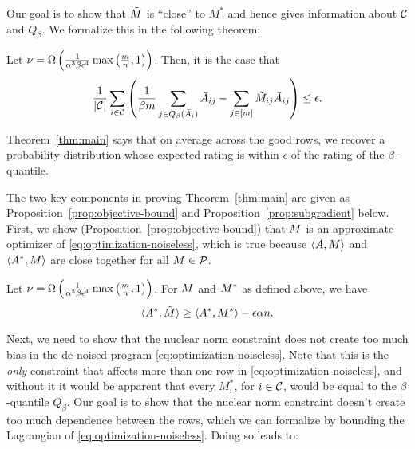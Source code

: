 Our goal is to show that $\tilde{M}$ is ``close'' to $M^*$ and hence gives information 
about $\mathcal{C}$ and $Q_{\beta}$. 
We formalize this in the following theorem:
\begin{theorem}
\label{thm:main}
Let $\nu = \Omega\left( \frac{1}{\alpha^3\beta\epsilon^4}\max\left( \frac{m}{n},1 \right) \right)$. Then, it is the case that 
\[ \frac{1}{|\mathcal{C}|} \sum_{i \in \mathcal{C}} \left( \frac{1}{\beta m} \sum_{j \in Q_{\beta}(\bar{A}_i)} \bar{A}_{ij} - \sum_{j \in [m]} \tilde{M}_{ij} \bar{A}_{ij} \right) \leq \epsilon. \]
\end{theorem}
Theorem~\ref{thm:main} says that on average across the good rows, we recover 
a probability distribution whose expected rating is within $\epsilon$ of 
the rating of the $\beta$-quantile. 

The two key components in proving Theorem~\ref{thm:main} are 
given as Proposition~\ref{prop:objective-bound} and 
Proposition~\ref{prop:subgradient} below. First, we show 
(Proposition~\ref{prop:objective-bound}) that $\tilde{M}$ is an approximate optimizer 
of \ref{eq:optimization-noiseless}, which is true because 
$\langle \tilde{A}, M \rangle$ and $\langle A^*, M \rangle$ are close together for 
all $M \in \mathcal{P}$.
\begin{proposition}
\label{prop:objective-bound}
Let $\nu = \Omega\left( \frac{1}{\alpha^3\beta\epsilon^4}\max\left( \frac{m}{n},1 \right) \right)$. For $\tilde{M}$ and $M^*$ as defined above, we have
\begin{equation}
\label{eq:objective-bound}
\langle A^*, \tilde{M} \rangle \geq \langle A^*, M^* \rangle - \epsilon \alpha n.
\end{equation}
\end{proposition}

Next, we need to show that the nuclear norm constraint does 
not create too much bias in the de-noised program 
\eqref{eq:optimization-noiseless}. Note that this is the \emph{only} constraint 
that affects more than one row in \eqref{eq:optimization-noiseless}, and without 
it it would be apparent that every $M^*_i$, for $i \in \mathcal{C}$, would be equal to the 
$\beta$-quantile $Q_{\beta}$. Our goal is to show that the nuclear norm 
constraint doesn't create too much dependence between the rows, which we can 
formalize by bounding the Lagrangian of \eqref{eq:optimization-noiseless}. 
Doing so leads to:

